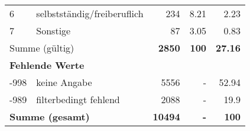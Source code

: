\begin{longtable}{lXrrr}
     6 &
     \multicolumn{1}{X}{ selbstständig/freiberuflich   } &


       \num{234} &
       \num[round-mode=places,round-precision=2]{8.21} &
         \num[round-mode=places,round-precision=2]{2.23} \\

     7 &
     \multicolumn{1}{X}{ Sonstige   } &


       \num{87} &
       \num[round-mode=places,round-precision=2]{3.05} &
         \num[round-mode=places,round-precision=2]{0.83} \\
     \midrule
     \multicolumn{2}{l}{Summe (gültig)} &
       \textbf{\num{2850}} &
     \textbf{\num{100}} &
       \textbf{\num[round-mode=places,round-precision=2]{27.16}} \\
     \multicolumn{5}{l}{\textbf{Fehlende Werte}}\\
       -998 &
       keine Angabe &
         \num{5556} &
        - &
         \num[round-mode=places,round-precision=2]{52.94} \\
       -989 &
       filterbedingt fehlend &
         \num{2088} &
        - &
         \num[round-mode=places,round-precision=2]{19.9} \\
     \midrule
     \multicolumn{2}{l}{\textbf{Summe (gesamt)}} &
          \textbf{\num{10494}} &
        \textbf{-} &
        \textbf{\num{100}} \\
     \bottomrule
     \end{longtable}
     
